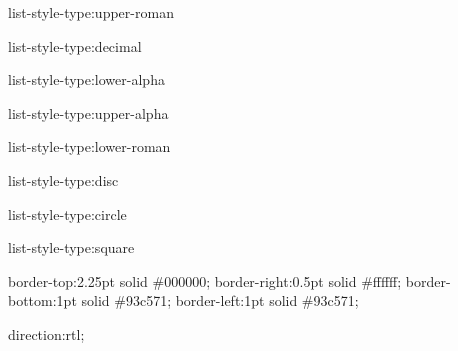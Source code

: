 \documentclass[12pt,twoside,openany]{book}
\newenvironment{lateiDocument}{}{}
\begin{document}
\begin{lateiDocument}
\begin{teiElement}[name={TEI}]
\begin{teiElement}[name={teiHeader}]
\begin{teiElement}[name={encodingDesc}]
\begin{teiElement}[name={tagsDecl}]
				\begin{teiElement}[name={rendition},xmlid={rendition_list1},scheme={css}]
list-style-type:upper-roman
\end{teiElement}
				\begin{teiElement}[name={rendition},xmlid={rendition_list2},scheme={css}]
list-style-type:decimal
\end{teiElement}
				\begin{teiElement}[name={rendition},xmlid={rendition_list3},scheme={css}]
list-style-type:lower-alpha
\end{teiElement}
				\begin{teiElement}[name={rendition},xmlid={rendition_list4},scheme={css}]
list-style-type:upper-alpha
\end{teiElement}
				\begin{teiElement}[name={rendition},xmlid={rendition_list5},scheme={css}]
list-style-type:lower-roman
\end{teiElement}
				\begin{teiElement}[name={rendition},xmlid={rendition_list6},scheme={css}]
list-style-type:disc
\end{teiElement}
				\begin{teiElement}[name={rendition},xmlid={rendition_list7},scheme={css}]
list-style-type:circle
\end{teiElement}
				\begin{teiElement}[name={rendition},xmlid={rendition_list8},scheme={css}]
list-style-type:square
\end{teiElement}
				\begin{teiElement}[name={rendition},scheme={css},xmlid={Cell}]
border-top:2.25pt solid \#000000; border-right:0.5pt
					solid \#ffffff; border-bottom:1pt solid \#93c571; border-left:1pt solid \#93c571; 
\end{teiElement}
				\begin{teiElement}[name={rendition},xmlid={rtl},scheme={css}]
direction:rtl;
\end{teiElement}
			
\end{teiElement}
		
\end{teiElement}
		\begin{teiElement}[name={profileDesc}]

			\begin{teiElement}[name={langUsage}]

				\begin{teiElement}[name={language},ident={fr-FR}]


\end{teiElement}
\end{teiElement}
\end{teiElement}
\end{teiElement}
\end{teiElement}
\end{lateiDocument}
\end{document}
